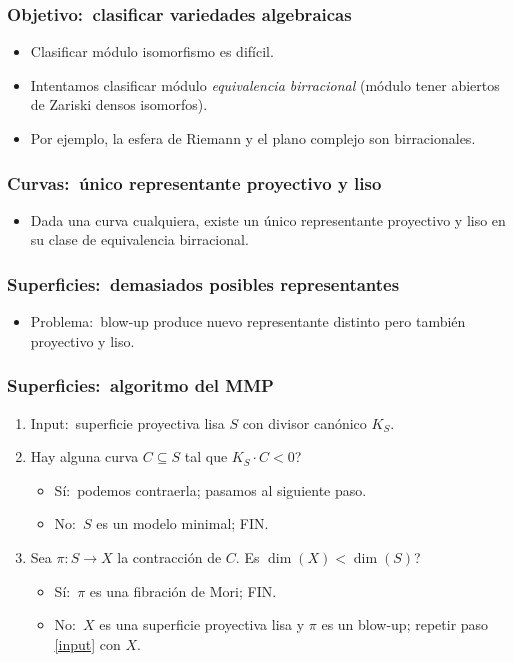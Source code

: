 \documentclass[12pt]{beamer}
\begin{document}
\begin{frame}
  \frametitle{Objetivo:~clasificar variedades algebraicas}
  \begin{itemize}
    \item Clasificar módulo isomorfismo es difícil.
      \pause
    \item Intentamos clasificar módulo \textit{equivalencia birracional} (módulo tener abiertos de Zariski densos isomorfos).
      \pause
    \item Por ejemplo, la esfera de Riemann y el plano complejo son birracionales.
  \end{itemize}
\end{frame}

\begin{frame}
  \frametitle{Curvas:~único representante proyectivo y liso}
  \begin{itemize}
    \item Dada una curva cualquiera, existe un único representante proyectivo y liso en su clase de equivalencia birracional.
  \end{itemize}
\end{frame}

\begin{frame}
  \frametitle{Superficies:~demasiados posibles representantes}
  \begin{itemize}
    \item Problema:~blow-up produce nuevo representante distinto pero también proyectivo y liso.
  \end{itemize}
\end{frame}

\begin{frame}
  \frametitle{Superficies:~algoritmo del MMP}
  \begin{enumerate}
    \item Input:~superficie proyectiva lisa $S$ con divisor canónico $K_{S}$.\label{input}
      \pause
    \item Hay alguna curva $C \subseteq S$ tal que $K_{S}\cdot C < 0$?
      \pause
      \begin{itemize}
        \item Sí:~podemos contraerla; pasamos al siguiente paso.
        \item No:~$S$ es un modelo minimal; FIN.
      \end{itemize}
      \pause
    \item Sea $\pi \colon S \to X$ la contracción de $C$.
      Es $\dim(X) < \dim(S)$?
      \pause
      \begin{itemize}
        \item Sí:~$\pi$ es una fibración de Mori; FIN.
        \item No:~$X$ es una superficie proyectiva lisa y $\pi$ es un blow-up; repetir paso \ref{input} con $X$.
      \end{itemize}
  \end{enumerate}
\end{frame}
\end{document}
